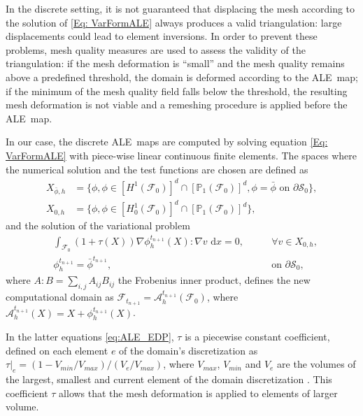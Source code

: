\documentclass[graybox]{svmult}
\newcommand{\Fluid}{\mathcal{F}} %
\newcommand{\Alemap}{\mathcal{A}} %
\newcommand{\ALE}{ALE} %
\newcommand{\CompDomain}{\Fluid}
\newcommand{\dx}{\, \mathrm{d}x}
\begin{document}
In the discrete setting, it is not guaranteed that displacing the mesh according to the solution of \eqref{Eq: VarFormALE} always produces a valid triangulation: large displacements could lead to element inversions.
In order to prevent these problems, mesh quality measures \cite{field_qualitative_2000} are used to assess the validity of the triangulation: if the mesh deformation is ``small'' and the mesh quality remains above a predefined threshold, the domain is deformed according to the \ALE\ map; if the minimum of the mesh quality field falls below the threshold, the resulting mesh deformation is not viable and a remeshing procedure is applied before the \ALE\ map.

In our case, the discrete \ALE\ maps are computed by solving equation \eqref{Eq: VarFormALE} with piece-wise linear continuous finite elements. The spaces where the numerical solution and the test functions are chosen are defined as
\begin{equation}
	\begin{aligned}
		X_{\bar{\phi},h} &= \{  \phi , \phi \in [H^1(\CompDomain_{0})]^d\cap [\mathbb{P}_1(\CompDomain_{0})]^d, \phi=\bar{\phi} \text{ on $\partial \mathcal{S}_{0}$}\},\\
		X_{0,h} &= \{  \phi ,\phi \in [H^1_0(\CompDomain_{0})]^d\cap [\mathbb{P}_1(\CompDomain_{0})]^d\},
	\end{aligned}
\end{equation}
and the solution of the variational problem 
	\begin{equation}
		\begin{aligned}
			&\int_{\CompDomain_{0}} (1+\tau(X))\nabla \phi^{t_{n+1}}_h (X)  : \nabla v \,\dx= 0, \qquad &\text{$\forall v \in X_{0,h}$},
			\\
			&\mathcal{\phi}_h^{t_{n+1}}= \bar{\phi}^{t_{n+1}}, &\text{on $\partial\mathcal{S}_{0}$},
		\end{aligned}
  \label{eq:ALE_EDP}
	\end{equation}
where $A:B = \sum_{i,j} A_{ij}B_{ij}$ the Frobenius inner product, defines the new computational domain as $\CompDomain_{t_{n+1}}=\Alemap_h^{t_{n+1}}(\CompDomain_{0})$, where $\Alemap_h^{t_{n+1}}(X) = X + \phi_h^{t_{n+1}}(X)$. 

In the latter equations \eqref{eq:ALE_EDP}, $\tau$ is a piecewise constant coefficient, defined on each element $e$ of the domain's discretization as $ \tau\big |_e=(1-V_{min}/V_{max})/(V_e/V_{max})$, where $V_{max}$, $V_{min}$  and $V_e$ are the volumes of the largest, smallest and current element of the domain discretization \cite{kanchi_3d_2007}. This coefficient $\tau$ allows that the mesh deformation is  applied to elements of larger volume.
\end{document}
